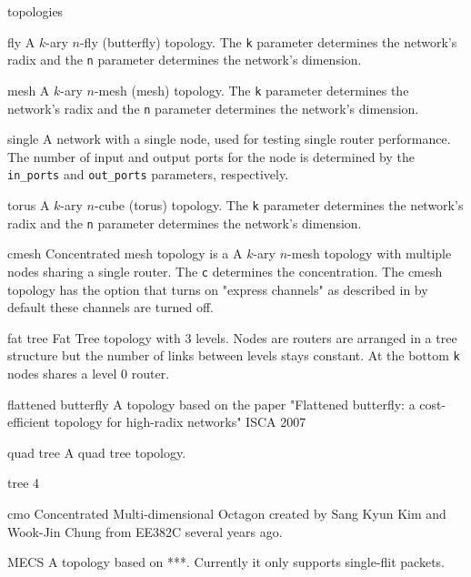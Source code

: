 \documentclass[11pt]{article}
\begin{document}
\begin{opt_list}{topologies}
\item[fly] A $k$-ary $n$-fly (butterfly) topology. The \texttt{k}
parameter determines the network's radix and the \texttt{n} parameter
determines the network's dimension.

\item[mesh] A $k$-ary $n$-mesh (mesh) topology. The \texttt{k}
parameter determines the network's radix and the \texttt{n} parameter determines
the network's dimension.

\item[single] A network with a single node, used for testing single
router performance.  The number of input and output ports for the node
is determined by the \texttt{in\_ports} and \texttt{out\_ports} parameters,
respectively.

\item[torus] A $k$-ary $n$-cube (torus) topology.  The \texttt{k}
parameter determines the network's radix and the \texttt{n} parameter determines
the network's dimension.
\item[cmesh] Concentrated mesh topology is a A $k$-ary $n$-mesh topology with multiple nodes sharing a single router. The \texttt{c} determines the concentration. The cmesh topology has the option that turns on "express channels" as described in  by default these channels are turned off. 

\item[fat tree] Fat Tree topology with 3 levels. Nodes are routers are arranged in a tree structure but the number of links between levels stays constant. At the bottom \texttt{k} nodes shares a level 0 router.

\item[flattened butterfly] A topology based on the paper "Flattened butterfly: a cost-efficient topology for high-radix networks" ISCA 2007

\item[quad tree] A quad tree topology.

\item[tree 4]

\item[cmo] Concentrated Multi-dimensional Octagon created by Sang Kyun Kim and Wook-Jin Chung from  EE382C several years ago.

\item[MECS] A topology based on ***. Currently it only supports single-flit packets. 

\end{opt_list}
\end{document}
